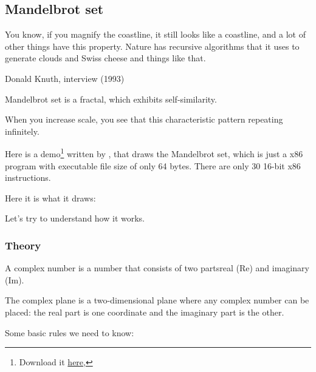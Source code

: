 ﻿\clearpage
\subsection{Mandelbrot set}
\label{Mandelbrot_demo}

\epigraph{You know, if you magnify the coastline, it still looks like
a coastline, and a lot of other things have this property. Nature has
recursive algorithms that it uses to generate clouds and Swiss cheese
and things like that.}
{Donald Knuth, interview (1993)}

Mandelbrot set is a fractal, which exhibits self-similarity.

When you increase scale, you see that this characteristic pattern repeating infinitely.

Here is a demo\footnote{Download it \href{http://go.yurichev.com/17306}
{here},} 
written by  , 
that draws 
the Mandelbrot set, which is just a x86 program with executable file size of only 64 bytes.
There are only 30 16-bit x86 instructions.

Here it is what it draws:

\begin{figure}[H]
\centering
{}
\end{figure}

Let's try to understand how it works.

\subsubsection{Theory}


A complex number is a number that consists of two parts\EMDASH{}real (Re) and imaginary (Im).


The complex plane is a two-dimensional plane where any complex number can be placed: the real part is one coordinate
and the imaginary part is the other.

Some basic rules we need to know:

